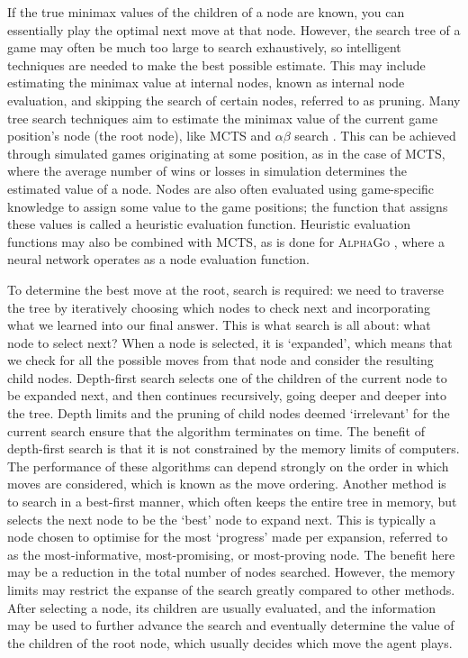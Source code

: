 If the true minimax values of the children of a node are known, you can essentially play the optimal next move at that node. However, the search tree of a game may often be much too large to search exhaustively, so intelligent techniques are needed to make the best possible estimate. This may include estimating the minimax value at internal nodes, known as internal node evaluation, and skipping the search of certain nodes, referred to as pruning. Many tree search techniques aim to estimate the minimax value of the current game position’s node (the root node), like MCTS \cite{Coulom2007} and $\alpha\beta$ search \cite{Knuth1975}. This can be achieved through simulated games originating at some position, as in the case of MCTS, where the average number of wins or losses in simulation determines the estimated value of a node. Nodes are also often evaluated using game-specific knowledge to assign some value to the game positions; the function that assigns these values is called a heuristic evaluation function. Heuristic evaluation functions may also be combined with MCTS, as is done for \textsc{AlphaGo} \cite{Silver2016}, where a neural network operates as a node evaluation function.

To determine the best move at the root, search is required: we need to traverse the tree by iteratively choosing which nodes to check next and incorporating what we learned into our final answer. This is what search is all about: what node to select next? When a node is selected, it is `expanded’, which means that we check for all the possible moves from that node and consider the resulting child nodes. Depth-first search selects one of the children of the current node to be expanded next, and then continues recursively, going deeper and deeper into the tree. Depth limits and the pruning of child nodes deemed `irrelevant’ for the current search ensure that the algorithm terminates on time. The benefit of depth-first search is that it is not constrained by the memory limits of computers. The performance of these algorithms can depend strongly on the order in which moves are considered, which is known as the move ordering. Another method is to search in a best-first manner, which often keeps the entire tree in memory, but selects the next node to be the `best’ node to expand next. This is typically a node chosen to optimise for the most `progress' made per expansion, referred to as the most-informative, most-promising, or most-proving node. The benefit here may be a reduction in the total number of nodes searched. However, the memory limits may restrict the expanse of the search greatly compared to other methods. After selecting a node, its children are usually evaluated, and the information may be used to further advance the search and eventually determine the value of the children of the root node, which usually decides which move the agent plays.

